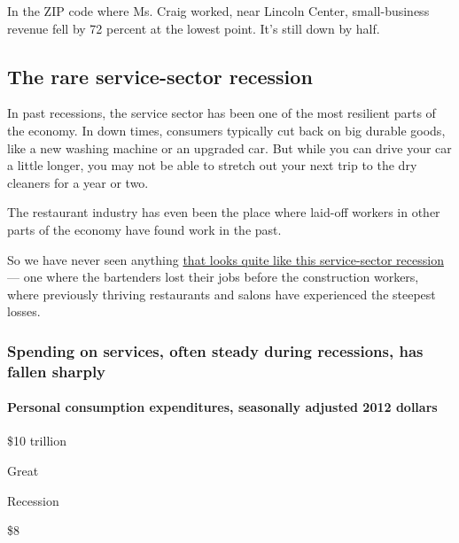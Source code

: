 In the ZIP code where Ms. Craig worked, near Lincoln Center,
small-business revenue fell by 72 percent at the lowest point. It's
still down by half.

\hypertarget{the-rare-service-sector-recession}{%
\subsection{The rare service-sector
recession}\label{the-rare-service-sector-recession}}

In past recessions, the service sector has been one of the most
resilient parts of the economy. In down times, consumers typically cut
back on big durable goods, like a new washing machine or an upgraded
car. But while you can drive your car a little longer, you may not be
able to stretch out your next trip to the dry cleaners for a year or
two.

The restaurant industry has even been the place where laid-off workers
in other parts of the economy have found work in the past.

So we have never seen anything
\href{https://www.dropbox.com/s/fd1i4r6xqhfjlfx/The\%20Coronavirus\%20crisis\%20will\%20be\%20the\%20first\%20services\%20recession.pdf?dl=0}{that
looks quite like this service-sector recession} --- one where the
bartenders lost their jobs before the construction workers, where
previously thriving restaurants and salons have experienced the steepest
losses.

\hypertarget{spending-on-services-often-steady-during-recessions-has-fallen-sharply}{%
\subsubsection{Spending on services, often steady during recessions, has
fallen
sharply}\label{spending-on-services-often-steady-during-recessions-has-fallen-sharply}}

\hypertarget{personal-consumption-expenditures-seasonally-adjusted-2012-dollars}{%
\paragraph{Personal consumption expenditures, seasonally adjusted 2012
dollars}\label{personal-consumption-expenditures-seasonally-adjusted-2012-dollars}}

\$10 trillion

Great

Recession

\$8

